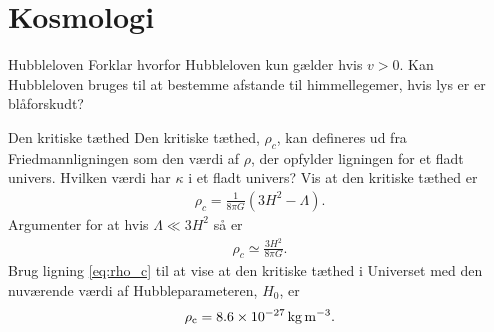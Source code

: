 \documentclass[crop=false, class=memoir]{standalone}
\begin{document}
\chapter{Kosmologi} \label{chap:kosmo_opg}

\begin{opgave}[1]{Hubbleloven}
    \opg Forklar hvorfor Hubbleloven kun gælder hvis $v>0$.
    \opg Kan Hubbleloven bruges til at bestemme afstande til himmellegemer, hvis lys er er blåforskudt?
\end{opgave}

\begin{opgave}[1]{Den kritiske tæthed}
Den kritiske tæthed, $\rho_c$, kan defineres ud fra Friedmannligningen som den værdi af $\rho$, der opfylder ligningen for et fladt univers.
\opg Hvilken værdi har $\kappa$ i et fladt univers?
\opg Vis at den kritiske tæthed er
%
\begin{align}
    \rho_c = \frac{1}{8\pi G}\left(3H^2 - \Lambda\right).
\end{align}
%
\opg Argumenter for at hvis $\Lambda \ll 3H^2$ så er
%
\begin{align} \label{eq:rho_c}
    \rho_c \simeq \frac{3H^2}{8\pi G}.
\end{align}
%
\opg Brug ligning \eqref{eq:rho_c} til at vise at den kritiske tæthed i Universet med den nuværende værdi af Hubbleparameteren, $H_0$, er
%
\begin{align*}
    \rho_\textup{c} = \SI{8.6e-27}{\kilo\gram\per\cubic\metre}.
\end{align*}
\end{opgave}
\end{document}
